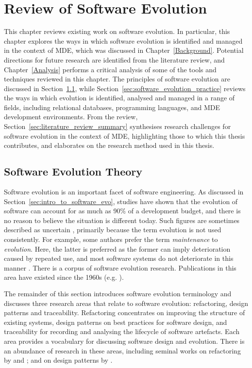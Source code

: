 
\chapter{Review of Software Evolution}
\label{LiteratureReview}
This chapter reviews existing work on software evolution. In particular, this chapter explores the ways in which software evolution is identified and managed in the context of MDE, which was discussed in Chapter~\ref{Background}. Potential directions for future research are identified from the literature review, and Chapter~\ref{Analysis} performs a critical analysis of some of the tools and techniques reviewed in this chapter. The principles of software evolution are discussed in Section~\ref{sec:software_evolution_theory}, while Section~\ref{sec:software_evolution_practice} reviews the ways in which evolution is identified, analysed and managed in a range of fields, including relational databases, programming languages, and MDE development environments. From the review, Section~\ref{sec:literature_review_summary} synthesises research challenges for software evolution in the context of MDE, highlighting those to which this thesis contributes, and elaborates on the research method used in this thesis.

\section{Software Evolution Theory}
\label{sec:software_evolution_theory}
Software evolution is an important facet of software engineering. As discussed in Section~\ref{sec:intro_to_software_evo}, studies \cite{erlikh00leveraging,moad90maintaining} have shown that the evolution of software can account for as much as 90\% of a development budget, and there is no reason to believe the situation is different today. Such figures are sometimes described as uncertain \cite[ch. 21]{sommerville06software}, primarily because the term evolution is not used consistently. For example, some authors prefer the term \emph{maintenance} to \emph{evolution}. Here, the latter is preferred as the former can imply deterioration caused by repeated use, and most software systems do not deteriorate in this manner \cite{ramil00cost}. There is a corpus of software evolution research. Publications in this area have existed since the 1960s (e.g. \cite{lehman69programming}).

The remainder of this section introduces software evolution terminology and discusses three research areas that relate to software evolution: refactoring, design patterns and traceability. Refactoring concentrates on improving the structure of existing systems, design patterns on best practices for software design, and traceability for recording and analysing the lifecycle of software artefacts. Each area provides a vocabulary for discussing software design and evolution. There is an abundance of research in these areas, including seminal works on refactoring by \cite{opdyke92refactoring} and \cite{fowler99refactoring}; and on design patterns by \cite{gamma95patterns}.

